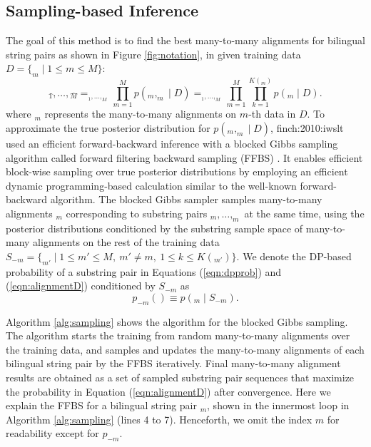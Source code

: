 \documentclass[english]{jnlp_1.4}
\def\pair#1#2{}
\def\subpair#1#2{}
\newcommand{\svec}[1]{}
\newcommand{\argmax}{}
\newcommand{\newcite}{}
\begin{document}
\subsection{Sampling-based Inference}

The goal of this method is to find the best many-to-many alignments for bilingual string pairs as shown in Figure \ref{fig:notation},
in given training data {$D = \{ \pair{\svec{s}}{\svec{t}}_m \mid 1 \leq m \leq M \}$}:
\begin{equation}
 \hat{\svec{a}_1} ,\ldots, \hat{\svec{a}_M} = \argmax_{\svec{a}_1 ,\ldots , \svec{a}_M} \prod_{m=1}^M p ( \pair{\svec{s}}{\svec{t}}_m, \svec{a}_m \mid D) = \argmax_{\svec{a}_1 ,\ldots, \svec{a}_M} \prod_{m=1}^M \prod_{k=1}^{K(\svec{a}_m)}p ( \subpair{\svec{\sigma}_{k}}{\svec{\tau}_{k}}_{m} \mid D). 
\label{eqn:alignmentD}
\end{equation}
where {$\svec{a}_m$} represents the many-to-many alignments on $m$-th data in $D$.
To approximate the true posterior distribution for {$p \left(\pair{\svec{s}}{\svec{t}}_m, \svec{a}_m \mid D \right)$},
{\newcite{finch:2010:iwslt}} used an efficient forward-backward inference with a blocked Gibbs sampling algorithm
called forward filtering backward sampling (FFBS) \cite{scott:2002:jasa,mochihashi:2009:acl}.
It enables efficient block-wise sampling over true posterior distributions
by employing an efficient dynamic programming-based calculation
similar to the well-known forward-backward algorithm.
The blocked Gibbs sampler samples many-to-many alignments {$\svec{a}_m$}
corresponding to substring pairs
{$\subpair{\svec{\sigma}_{1}}{\svec{\tau}_{1}}_m, \ldots, \subpair{\svec{\sigma}_{K(\svec{a}_m)}}{\svec{\tau}_{K(\svec{a}_m)}}_m$} at the same time,
using the posterior distributions conditioned by the substring sample space of many-to-many alignments on the rest of the training data
{$S_{-m} = \{ \pair{\svec{\sigma}_{k}}{\svec{\tau}_{k}}_{m'} \mid 1 \leq m' \leq M,\ m' \neq m,\ 1 \leq k \leq K(\svec{a}_{m'}) \}$}.
We denote the DP-based probability of a substring pair in Equations ({\ref{eqn:dpprob}}) and ({\ref{eqn:alignmentD}}) conditioned by {$S_{-m}$} as
\begin{equation}
p_{-m} ( \subpair{\svec{\sigma}_{k}}{\svec{\tau}_{k}}) \equiv p( \subpair{\svec{\sigma}_{k}}{\svec{\tau}_{k}}_{m} \mid S_{-m}).
\end{equation}


Algorithm {\ref{alg:sampling}} shows the algorithm for the blocked Gibbs sampling.
The algorithm starts the training from random many-to-many alignments over the training data,
and samples and updates the many-to-many alignments of each bilingual string pair by the FFBS iteratively.
Final many-to-many alignment results are obtained as a set of sampled substring pair sequences
that maximize the probability in Equation ({\ref{eqn:alignmentD}}) after convergence.
Here we explain the FFBS for a bilingual string pair {$\pair{\svec{s}}{\svec{t}}_m$},
shown in the innermost loop in Algorithm {\ref{alg:sampling}} (lines 4 to 7).
Henceforth, we omit the index {$m$} for readability except for {$p_{-m}$}.
\end{document}
